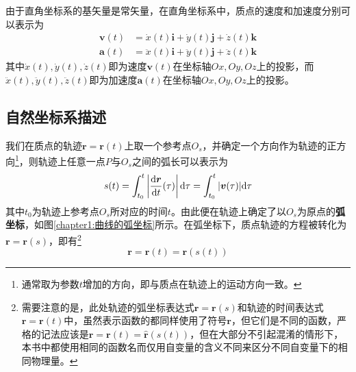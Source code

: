 由于直角坐标系的基矢量是常矢量，在直角坐标系中，质点的速度和加速度分别可以表示为
\begin{equation}
\begin{split}
	\boldsymbol{v}(t) & = \dot{x}(t)\boldsymbol{i} + \dot{y}(t)\boldsymbol{j} + \dot{z}(t)\boldsymbol{k} \\
	\boldsymbol{a}(t) & = \ddot{x}(t)\boldsymbol{i} + \ddot{y}(t)\boldsymbol{j} + \ddot{z}(t)\boldsymbol{k}
\end{split}
\end{equation}
其中$\dot{x}(t),\dot{y}(t),\dot{z}(t)$即为速度$\boldsymbol{v}(t)$在坐标轴$Ox,Oy,Oz$上的投影，而$\ddot{x}(t),\ddot{y}(t),\ddot{z}(t)$即为加速度$\boldsymbol{a}(t)$在坐标轴$Ox,Oy,Oz$上的投影。

\subsection{自然坐标系描述}

我们在质点的轨迹$\boldsymbol{r}=\boldsymbol{r}(t)$上取一个参考点$O_s$，并确定一个方向作为轨迹的正方向\footnote{通常取为参数$t$增加的方向，即与质点在轨迹上的运动方向一致。}，则轨迹上任意一点$P$与$O_s$之间的弧长可以表示为
\begin{equation}
	s(t) = \int_{t_0}^t \left|\frac{\mathrm{d}\boldsymbol{r}}{\mathrm{d} t}(\tau)\right|\mathrm{d} \tau = \int_{t_0}^t |\boldsymbol{v}(\tau)|\mathrm{d}\tau
	\label{chapter1:弧长坐标的定义式}
\end{equation}
其中$t_0$为轨迹上参考点$O_s$所对应的时间$t$。由此便在轨迹上确定了以$O_s$为原点的{\bf 弧坐标}，如图\ref{chapter1:曲线的弧坐标}所示。在弧坐标下，质点轨迹的方程被转化为$\boldsymbol{r}=\boldsymbol{r}(s)$，即有\footnote{需要注意的是，此处轨迹的弧坐标表达式$\boldsymbol{r}=\boldsymbol{r}(s)$和轨迹的时间表达式$\boldsymbol{r}=\boldsymbol{r}(t)$中，虽然表示函数的都同样使用了符号$\boldsymbol{r}$，但它们是不同的函数，严格的记法应该是$\boldsymbol{r} = \boldsymbol{r}(t) = \hat{\boldsymbol{r}}(s(t))$，但在大部分不引起混淆的情形下，本书中都使用相同的函数名而仅用自变量的含义不同来区分不同自变量下的相同物理量。}
\begin{equation}
	\boldsymbol{r} = \boldsymbol{r}(t) = \boldsymbol{r}(s(t))
\end{equation}

